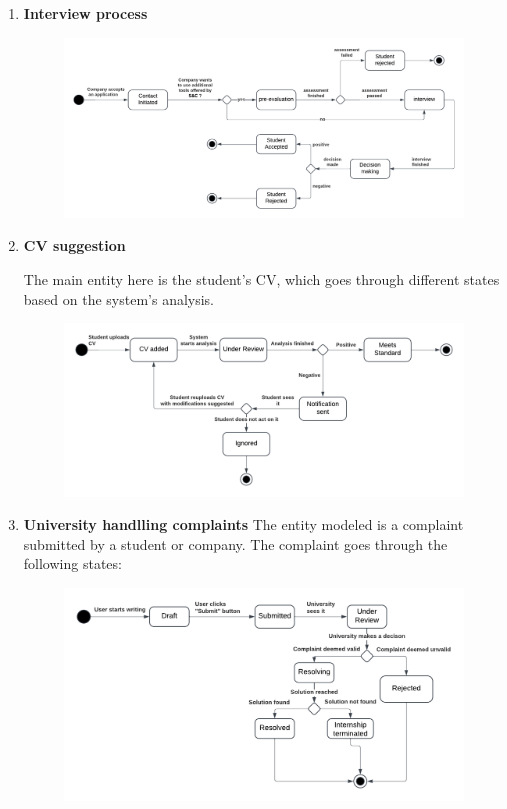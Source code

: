 \begin{enumerate}
\item \textbf{Interview process}


\begin{figure}[H]
    \centering
    \includegraphics[width=1\linewidth]{RASD//Images/interview.png}
    \caption{}
    \label{fig:enter-label}
\end{figure}


\item \textbf{CV suggestion}

The main entity here is the student’s CV, which goes through different states based on the system’s analysis.

\begin{figure}[H]
    \centering
    \includegraphics[width=1\linewidth]{RASD//Images/CV.png}
    \caption{}
    \label{fig:enter-label}
\end{figure}

\item \textbf{University handlling complaints}
The entity modeled is a complaint submitted by a student or company. The complaint goes through the following states:

\begin{figure}[H]
    \centering
    \includegraphics[width=1\linewidth]{RASD//Images/Complaints.png}
    \caption{}
    \label{fig:enter-label}
\end{figure}



\end{enumerate}
